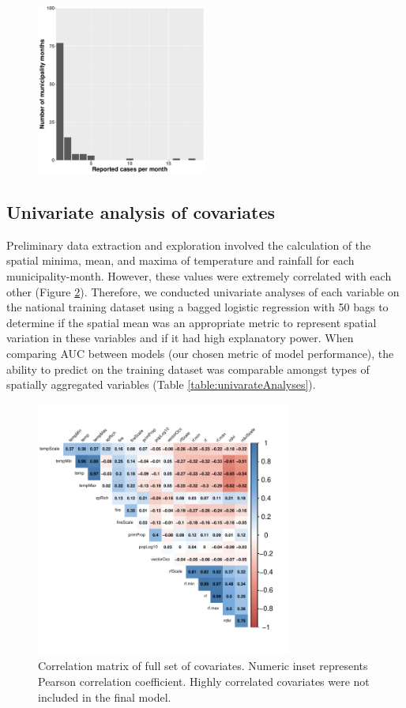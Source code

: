 \documentclass{article}
\begin{document}
\begin{figure} [h]
\centering
\includegraphics[width=0.5\textwidth]{Hist_Reported_Cases}
\caption{}
\label{}
\end{figure}

\subsection*{Univariate analysis of covariates}

Preliminary data extraction and exploration involved the calculation of the spatial minima, mean, and maxima of temperature and rainfall for each municipality-month.
However, these values were extremely correlated with each other (Figure \ref{fig:corrmat}).
Therefore, we conducted univariate analyses of each variable on the national training dataset using a bagged logistic regression with 50 bags to determine if the spatial mean was an appropriate metric to represent spatial variation in these variables and if it had high explanatory power.
When comparing AUC between models (our chosen metric of model performance), the ability to predict on the training dataset was comparable amongst types of spatially aggregated variables (Table \ref{table:univarateAnalyses}).

\begin{figure}
\centering
\includegraphics[width=0.75\textwidth]{correlationMatrix}
\caption{Correlation matrix of full set of covariates. Numeric inset represents Pearson correlation coefficient. Highly correlated covariates were not included in the final model.}
\label{fig:corrmat}
\end{figure}
\end{document}
